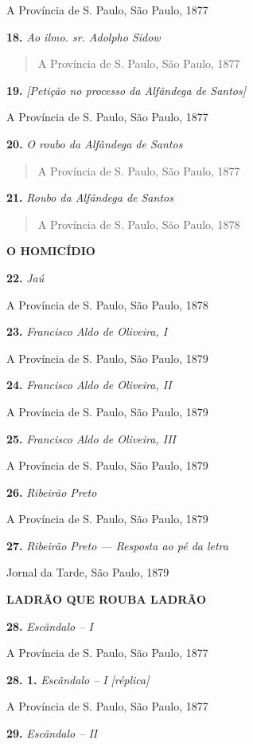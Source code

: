 A Província de S. Paulo, São Paulo, 1877

\textbf{18.} \emph{Ao ilmo. sr. Adolpho Sidow}

\begin{quote}
A Província de S. Paulo, São Paulo, 1877
\end{quote}

\textbf{19.} \emph{{[}Petição no processo da Alfândega de Santos{]}}

A Província de S. Paulo, São Paulo, 1877

\textbf{20.} \emph{O roubo da Alfândega de Santos}

\begin{quote}
A Província de S. Paulo, São Paulo, 1877
\end{quote}

\textbf{21.} \emph{Roubo da Alfândega de Santos}

\begin{quote}
A Província de S. Paulo, São Paulo, 1878
\end{quote}

\textbf{O HOMICÍDIO}

\textbf{22.} \emph{Jaú}

A Província de S. Paulo, São Paulo, 1878

\textbf{23.} \emph{Francisco Aldo de Oliveira, I}

A Província de S. Paulo, São Paulo, 1879

\textbf{24.} \emph{Francisco Aldo de Oliveira, II}

A Província de S. Paulo, São Paulo, 1879

\textbf{25.} \emph{Francisco Aldo de Oliveira, III}

A Província de S. Paulo, São Paulo, 1879

\textbf{26.} \emph{Ribeirão Preto}

A Província de S. Paulo, São Paulo, 1879

\textbf{27.} \emph{Ribeirão Preto --- Resposta ao pé da letra}

Jornal da Tarde, São Paulo, 1879

\textbf{LADRÃO QUE ROUBA LADRÃO}

\textbf{28.} \emph{Escândalo -- I}

A Província de S. Paulo, São Paulo, 1877

\textbf{28. 1.} \emph{Escândalo -- I} \emph{{[}réplica{]}}

A Província de S. Paulo, São Paulo, 1877

\textbf{29.} \emph{Escândalo -- II}

